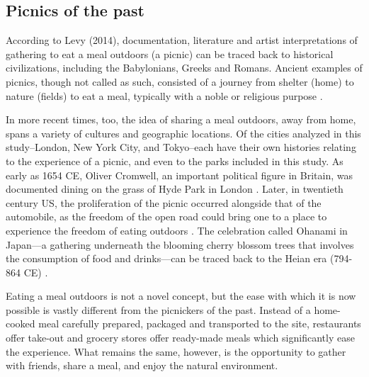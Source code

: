 \begin{multicols}{2}

\subsection{Picnics of the past}
According to Levy (2014), documentation, literature and artist interpretations of gathering to eat a meal outdoors (a picnic) can be traced back to historical civilizations, including the Babylonians, Greeks and Romans. Ancient examples of picnics, though not called as such, consisted of a journey from shelter (home) to nature (fields) to eat a meal, typically with a noble or religious purpose \cite{levy_picnic_2014}. 

In more recent times, too, the idea of sharing a meal outdoors, away from home, spans a variety of cultures and geographic locations. Of the cities analyzed in this study--London, New York City, and Tokyo--each have their own histories relating to the experience of a picnic, and even to the parks included in this study. As early as 1654 CE, Oliver Cromwell, an important political figure in Britain, was documented dining on the grass of Hyde Park in London \cite{levy_picnic_2014}. Later, in twentieth century US, the proliferation of the picnic occurred alongside that of the automobile, as the freedom of the open road could bring one to a place to experience the freedom of eating outdoors \cite{levy_picnic_2014}. The celebration called Ohanami in Japan---a gathering underneath the blooming cherry blossom trees that involves the consumption of food and drinks---can be traced back to the Heian era (794-864 CE) \cite{moriuchi_sustainability_2019}. 

Eating a meal outdoors is not a novel concept, but the ease with which it is now possible is vastly different from the picnickers of the past. Instead of a home-cooked meal carefully prepared, packaged and transported to the site, restaurants offer take-out and grocery stores offer ready-made meals which significantly ease the experience. What remains the same, however, is the opportunity to gather with friends, share a meal, and enjoy the natural environment. 


\end{multicols}
